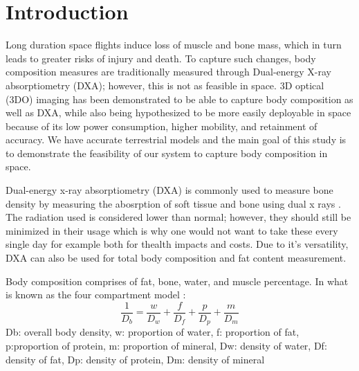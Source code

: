 

\chapter{Introduction}

Long duration space flights induce loss of muscle and bone mass, which in turn leads to greater risks of injury and death. To capture such changes, body composition measures are traditionally measured through Dual-energy X-ray absorptiometry (DXA); however, this is not as feasible in space. 3D optical (3DO) imaging has been demonstrated to be able to capture body composition as well as DXA, while also being hypothesized to be more easily deployable in space because of its low power consumption, higher mobility, and retainment of accuracy. We have accurate terrestrial models and the main goal of this study is to demonstrate the feasibility of our system to capture body composition in space. 

Dual-energy x-ray absorptiometry (DXA) is commonly used to measure bone density by measuring the abosrption of soft tissue and bone using dual x rays \cite{albanese2003clinical}. The radiation used is considered lower than normal; however, they should still be minimized in their usage which is why one would not want to take these every single day for example both for thealth impacts and costs. Due to it's versatility, DXA can also be used for total body composition and fat content measurement.

Body composition comprises of fat, bone, water, and muscle percentage. In what is known as the four compartment model \cite{fuller1992four}:
\begin{equation}
	\frac{1}{D_b} = \frac{w}{D_w} + \frac{f}{D_f} + \frac{p}{D_p} + \frac{m}{D_m}
\end{equation}
Db: overall body density, w: proportion of water, f: proportion of fat, p:proportion of protein, m: proportion of mineral, Dw: density of water, Df: density of fat, Dp: density of protein, Dm: density of mineral

